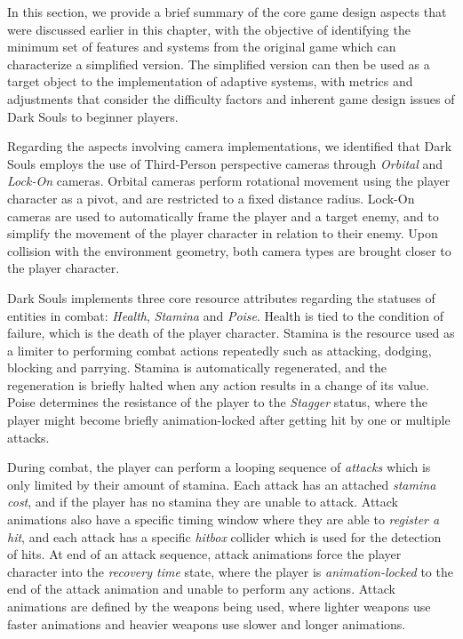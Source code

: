In this section, we provide a brief summary of the core game design aspects that were discussed earlier in this chapter, with the objective of identifying the minimum set of features and systems from the original game which can characterize a simplified version. The simplified version can then be used as a target object to the implementation of adaptive systems, with metrics and adjustments that consider the difficulty factors and inherent game design issues of Dark Souls to beginner players.

Regarding the aspects involving camera implementations, we identified that Dark Souls employs the use of Third-Person perspective cameras through \emph{Orbital} and \emph{Lock-On} cameras. Orbital cameras perform rotational movement using the player character as a pivot, and are restricted to a fixed distance radius. Lock-On cameras are used to automatically frame the player and a target enemy, and to simplify the movement of the player character in relation to their enemy. Upon collision with the environment geometry, both camera types are brought closer to the player character.

Dark Souls implements three core resource attributes regarding the statuses of entities in combat: \emph{Health}, \emph{Stamina} and \emph{Poise}. Health is tied to the condition of failure, which is the death of the player character. Stamina is the resource used as a limiter to performing combat actions repeatedly such as attacking, dodging, blocking and parrying. Stamina is automatically regenerated, and the regeneration is briefly halted when any action results in a change of its value. Poise determines the resistance of the player to the \emph{Stagger} status, where the player might become briefly animation-locked after getting hit by one or multiple attacks.

During combat, the player can perform a looping sequence of \emph{attacks} which is only limited by their amount of stamina. Each attack has an attached \emph{stamina cost}, and if the player has no stamina they are unable to attack. Attack animations also have a specific timing window where they are able to \emph{register a hit}, and each attack has a specific \emph{hitbox} collider which is used for the detection of hits. At end of an attack sequence, attack animations force the player character into the \emph{recovery time} state, where the player is \emph{animation-locked} to the end of the attack animation and unable to perform any actions. Attack animations are defined by the weapons being used, where lighter weapons use faster animations and heavier weapons use slower and longer animations.

